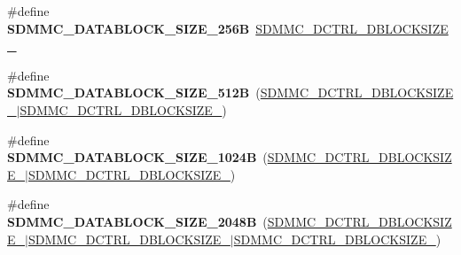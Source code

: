 \begin{DoxyCompactItemize}
\item 
\mbox{\label{group___s_d_m_m_c___l_l___data___block___size_ga907eea249d2b088c2dfea6d59f6ba79a}} 
\#define {\bfseries S\+D\+M\+M\+C\+\_\+\+D\+A\+T\+A\+B\+L\+O\+C\+K\+\_\+\+S\+I\+Z\+E\+\_\+256B}~\mbox{\hyperlink{group___peripheral___registers___bits___definition_ga70acaa28f679dee46b20847e6627b80c}{S\+D\+M\+M\+C\+\_\+\+D\+C\+T\+R\+L\+\_\+\+D\+B\+L\+O\+C\+K\+S\+I\+Z\+E\+\_}}
\item 
\mbox{\label{group___s_d_m_m_c___l_l___data___block___size_ga92514c9d67505e66030e9f552522c22f}} 
\#define {\bfseries S\+D\+M\+M\+C\+\_\+\+D\+A\+T\+A\+B\+L\+O\+C\+K\+\_\+\+S\+I\+Z\+E\+\_\+512B}~(\mbox{\hyperlink{group___peripheral___registers___bits___definition_gafacd555221e3b669839f2bdc24531c06}{S\+D\+M\+M\+C\+\_\+\+D\+C\+T\+R\+L\+\_\+\+D\+B\+L\+O\+C\+K\+S\+I\+Z\+E\+\_}}$\vert$\mbox{\hyperlink{group___peripheral___registers___bits___definition_ga70acaa28f679dee46b20847e6627b80c}{S\+D\+M\+M\+C\+\_\+\+D\+C\+T\+R\+L\+\_\+\+D\+B\+L\+O\+C\+K\+S\+I\+Z\+E\+\_}})
\item 
\mbox{\label{group___s_d_m_m_c___l_l___data___block___size_ga349b1632ec7e7ae25eb0d3d960440085}} 
\#define {\bfseries S\+D\+M\+M\+C\+\_\+\+D\+A\+T\+A\+B\+L\+O\+C\+K\+\_\+\+S\+I\+Z\+E\+\_\+1024B}~(\mbox{\hyperlink{group___peripheral___registers___bits___definition_gaed289ccb613a89c9fbada5cd541b88c4}{S\+D\+M\+M\+C\+\_\+\+D\+C\+T\+R\+L\+\_\+\+D\+B\+L\+O\+C\+K\+S\+I\+Z\+E\+\_}}$\vert$\mbox{\hyperlink{group___peripheral___registers___bits___definition_ga70acaa28f679dee46b20847e6627b80c}{S\+D\+M\+M\+C\+\_\+\+D\+C\+T\+R\+L\+\_\+\+D\+B\+L\+O\+C\+K\+S\+I\+Z\+E\+\_}})
\item 
\mbox{\label{group___s_d_m_m_c___l_l___data___block___size_ga8b1480b8f40fc48bc0058d167b69c6c8}} 
\#define {\bfseries S\+D\+M\+M\+C\+\_\+\+D\+A\+T\+A\+B\+L\+O\+C\+K\+\_\+\+S\+I\+Z\+E\+\_\+2048B}~(\mbox{\hyperlink{group___peripheral___registers___bits___definition_gafacd555221e3b669839f2bdc24531c06}{S\+D\+M\+M\+C\+\_\+\+D\+C\+T\+R\+L\+\_\+\+D\+B\+L\+O\+C\+K\+S\+I\+Z\+E\+\_}}$\vert$\mbox{\hyperlink{group___peripheral___registers___bits___definition_gaed289ccb613a89c9fbada5cd541b88c4}{S\+D\+M\+M\+C\+\_\+\+D\+C\+T\+R\+L\+\_\+\+D\+B\+L\+O\+C\+K\+S\+I\+Z\+E\+\_}}$\vert$\mbox{\hyperlink{group___peripheral___registers___bits___definition_ga70acaa28f679dee46b20847e6627b80c}{S\+D\+M\+M\+C\+\_\+\+D\+C\+T\+R\+L\+\_\+\+D\+B\+L\+O\+C\+K\+S\+I\+Z\+E\+\_}})

\end{DoxyCompactItemize}
